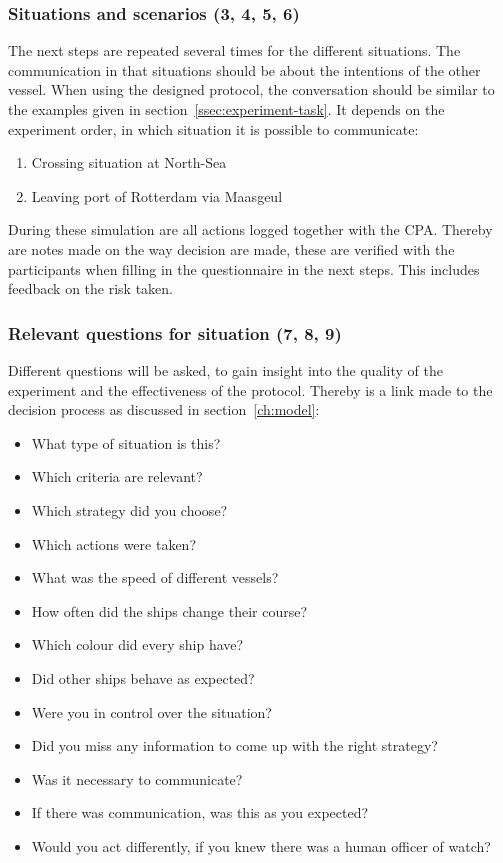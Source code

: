 \subsubsection{Situations and scenarios (3, 4, 5, 6)}
The next steps are repeated several times for the different situations. The communication in that situations should be about the intentions of the other vessel. When using the designed protocol, the conversation should be similar to the examples given in section~\ref{ssec:experiment-task}. It depends on the experiment order, in which situation it is possible to communicate:
\begin{spacing}{1}
	\begin{enumerate}
		\item Crossing situation at North-Sea
		\item Leaving port of Rotterdam via Maasgeul
	\end{enumerate}
\end{spacing}
During these simulation are all actions logged together with the \ac{CPA}. Thereby are notes made on the way decision are made, these are verified with the participants when filling in the questionnaire in the next steps. This includes feedback on the risk taken.

\subsubsection{Relevant questions for situation (7, 8, 9)}
Different questions will be asked, to gain insight into the quality of the experiment and the effectiveness of the protocol. Thereby is a link made to the decision process as discussed in section~\ref{ch:model}:
\begin{spacing}{1}
	\begin{itemize}
		\item What type of situation is this? \SA
		\item Which criteria are relevant? \performance
		\item Which strategy did you choose? \performance
		\item Which actions were taken? \performance
		\item What was the speed of different vessels? \SA
		\item How often did the ships change their course? \SA
		\item Which colour did every ship have? \SA
		\item Did other ships behave as expected? \SA \performance
		\item Were you in control over the situation? \performance \trust \satisfaction
		\item Did you miss any information to come up with the right strategy? \protocol \satisfaction
		\item Was it necessary to communicate? \SA \trust
		\item If there was communication, was this as you expected? \satisfaction
		\item Would you act differently, if you knew there was a human officer of watch? \trust \satisfaction
	\end{itemize}
\end{spacing}


